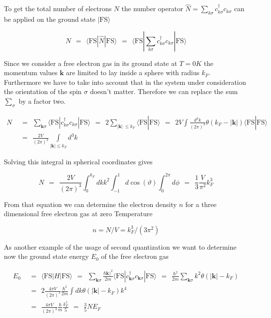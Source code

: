 \documentclass[10pt]{report}
\numberwithin{equation}{chapter}
\newcommand{\vc}[1]{ %
  \mathbf{#1}
}
\begin{document}
To get the total number of electrons $N$ the number operator $\hat{N} = \sum_{k \sigma} c_{k\sigma}^\dag c_{k\sigma}$ can be applied on the ground state $| \text{FS} \rangle$

\begin{equation}\label{eq:number_operator}
  N ~~=~~ \langle \text{FS} | \hat{N} | \text{FS} \rangle 
    ~~=~~ \langle \text{FS} | \sum_{k\sigma} c_{k\sigma}^\dag c_{k\sigma} | \text{FS} \rangle
\end{equation} 



Since we consider a free electron gas in its ground state at $T=0K$ the momentum values $\vc{k}$ are limited to lay inside a sphere with radius $k_F$. Furthermore we have to take into account that in the system under consideration the orientation  of the spin $\sigma$ doesn't matter. Therefore we can replace the sum $\sum_\sigma$ by a factor two. 


\begin{align}
  N ~~& =~~ \sum_{\mathbf{k} \sigma} \langle \text{FS} | c_{k\sigma}^\dag c_{k\sigma} | \text{FS} \rangle ~~=~~ 2 \sum_{|\mathbf{k}|\ \leq k_F} \langle \text{FS} | \text{FS} \rangle
  ~~=~~ 2V \int \frac{d^3k}{(2\pi)^3} \theta(k_F - |\mathbf{k}|) \langle \text{FS} | \text{FS} \rangle \nonumber \\
  ~~& =~~ \frac{2V}{(2\pi)^3} \underset{|\mathbf{k}| \leq k_F}{\int} d^3k
\end{align}

Solving this integral in spherical coordinates gives

\begin{equation}
  N ~~=~~ \frac{2V}{(2\pi)^3} \int_0^{k_F} dk k^2 \int_{-1}^1 d\cos(\vartheta) \int_0^{2\pi} d\phi
  ~~=~~ \frac{1}{3} \frac{V}{\pi^2} k_F^3
\end{equation}

From that equation we can determine the electron density  $n$ for a  three dimensional free electron gas at zero Temperature 

\begin{equation}\label{eq:el_density}
  n = N/V = k_F^3/(3\pi^2)
\end{equation}


As another example of the usage of second quantization we want to determine now the ground state energy $E_0$ of the free electron gas

\begin{align}
  E_0 ~~& =~~ \langle \text{FS} | H | \text{FS} \rangle 
  ~~=~~ \sum_{\mathbf{k} \sigma} \frac{\hbar \mathbf{k})^2}{2m} \langle \text{FS} | c^\dag_{\mathbf{k} \sigma} c_{\mathbf{k} \sigma} | \text{FS} \rangle
  ~~=~~ \frac{\hbar^2}{2m} \sum_{\mathbf{k}\sigma} k^2 \theta(|\mathbf{k}| - k_F) \nonumber \\ 
  ~~& =~~ 2 \frac{4\pi V}{(2\pi)^3} \frac{\hbar^2}{2m} \int dk \theta(|\mathbf{k}| - k_F) k^4\nonumber \\
  ~~& =~~ \frac{4\pi V}{(2\pi)^3} \frac{\hbar}{m} \frac{k_F^5}{5} ~~=~~ \frac{3}{5} N E_F
\end{align}
\end{document}
